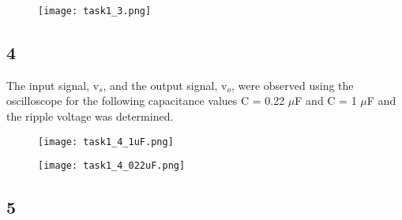     \begin{figure}[h!]
        \centering
        \texttt{[image: task1\_3.png]}
    \end{figure}

\subsection*{4}
    
    The input signal, v$_s$, and the output signal, v$_o$, were observed using the oscilloscope for the following capacitance values C = 0.22 $\mu$F and C = 1 $\mu$F and the ripple voltage was determined.\\

    \begin{figure}[h!]
        \centering
        \texttt{[image: task1\_4\_1uF.png]}
    \end{figure}

    \begin{figure}[h!]
        \centering
        \texttt{[image: task1\_4\_022uF.png]}
    \end{figure}

\subsection*{5}



